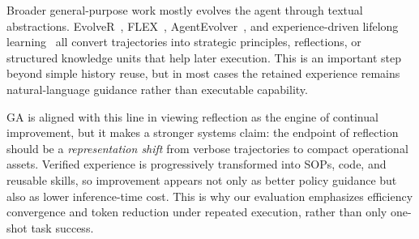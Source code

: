 Broader general-purpose work mostly evolves the agent through textual abstractions. EvolveR~\citep{evolver}, FLEX~\citep{flex}, AgentEvolver~\citep{agentevolver}, and experience-driven lifelong learning~\citep{selfevolvinglifelong} all convert trajectories into strategic principles, reflections, or structured knowledge units that help later execution. This is an important step beyond simple history reuse, but in most cases the retained experience remains natural-language guidance rather than executable capability.

GA is aligned with this line in viewing reflection as the engine of continual improvement, but it makes a stronger systems claim: the endpoint of reflection should be a \emph{representation shift} from verbose trajectories to compact operational assets. Verified experience is progressively transformed into SOPs, code, and reusable skills, so improvement appears not only as better policy guidance but also as lower inference-time cost. This is why our evaluation emphasizes efficiency convergence and token reduction under repeated execution, rather than only one-shot task success.


